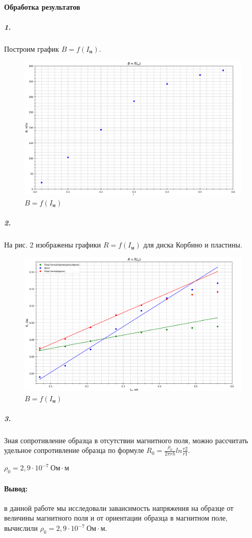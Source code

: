 \documentclass[a4paper,12pt]{article}
\begin{document}
\paragraph{Обработка результатов\\}
\subparagraph{1.} Построим график $B=f(I_{м})$.
\begin{figure}[!h]
\centering
\includegraphics[width=0.9\linewidth]{graph1.png}
\caption{$B=f(I_{м})$}
\label{fig:mpr}
\end{figure}

\subparagraph{2.}На рис. 2 изображены графики $R=f(I_{м})$ для диска Корбино и пластины.
\begin{figure}[!h]
\centering
\includegraphics[width=0.9\linewidth]{graph2.png}
\caption{$B=f(I_{м})$}
\label{fig:mpr}
\end{figure}
\newpage
\subparagraph{3.}Зная сопротивление образца в отсутствии магнитного поля, можно рассчитать удельное сопротивление образца по формуле $R_0 = \frac{\rho_0}{2\pi r h}ln\frac{r2}{r1}$.
\begin{center}
    $\rho_0 = 2,9 \cdot 10^{-7}~ Ом\cdot м$
\end{center}
\paragraph{Вывод:} в данной работе мы исследовали заваисимость напряжения на образце от величины магнитного поля и от ориентации образца в магнитном поле, вычислили $\rho_0 = 2,9 \cdot 10^{-7}~ Ом\cdot м$.
\end{document}
